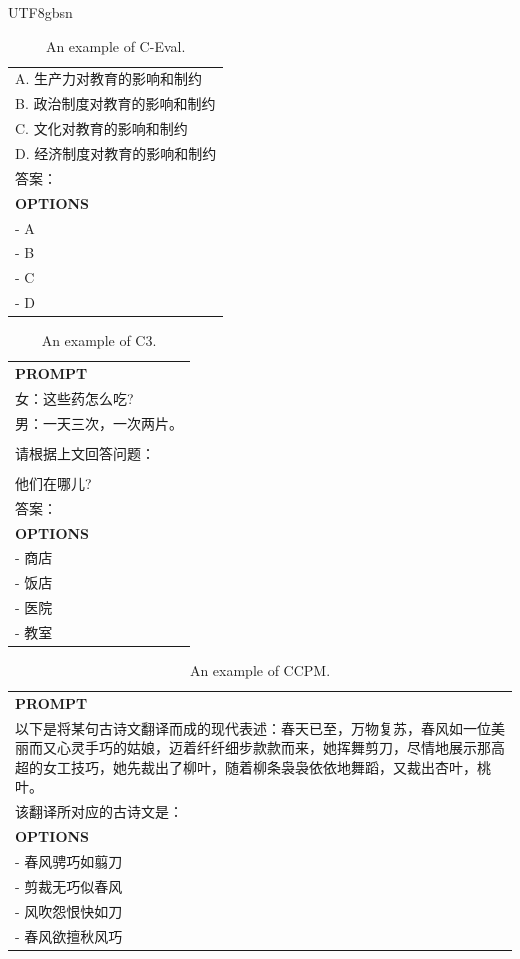 \documentclass[11pt, a4paper, logo, copyright, nonumbering]{deepseek}
\begin{document}
\begin{CJK*}{UTF8}{gbsn}
\begin{table}[h]
\begin{tabular}{p{12cm}}
\\A. 生产力对教育的影响和制约
\\B. 政治制度对教育的影响和制约
\\C. 文化对教育的影响和制约
\\D. 经济制度对教育的影响和制约
\\答案：\\
\midrule
\textbf{OPTIONS}\\
- A\\
- B\\
- C\\
- D\\
\bottomrule
\end{tabular}
    \caption{\centering An example of C-Eval.}
    \label{tab:ceval_eval_format_example}
\end{table}

\begin{table}[h]
    \centering \small
\begin{tabular}{p{12cm}}
\toprule
\textbf{PROMPT}\\
女：这些药怎么吃?
\\男：一天三次，一次两片。
\\
\\请根据上文回答问题：
\\
\\他们在哪儿?
\\答案：\\
\midrule
\textbf{OPTIONS}\\
- 商店\\
- 饭店\\
- 医院\\
- 教室\\
\bottomrule
\end{tabular}
    \caption{\centering An example of C3.}
    \label{tab:c3_eval_format_example}
\end{table}

\begin{table}[h]
    \centering \small
\begin{tabular}{p{12cm}}
\toprule
\textbf{PROMPT}\\
以下是将某句古诗文翻译而成的现代表述：春天已至，万物复苏，春风如一位美丽而又心灵手巧的姑娘，迈着纤纤细步款款而来，她挥舞剪刀，尽情地展示那高超的女工技巧，她先裁出了柳叶，随着柳条袅袅依依地舞蹈，又裁出杏叶，桃叶。
\\该翻译所对应的古诗文是：\\
\midrule
\textbf{OPTIONS}\\
- 春风骋巧如翦刀\\
- 剪裁无巧似春风\\
- 风吹怨恨快如刀\\
- 春风欲擅秋风巧\\
\bottomrule
\end{tabular}
    \caption{\centering An example of CCPM.}
    \label{tab:ccpm_eval_format_example}
\end{table}


\end{CJK*}
\end{document}
